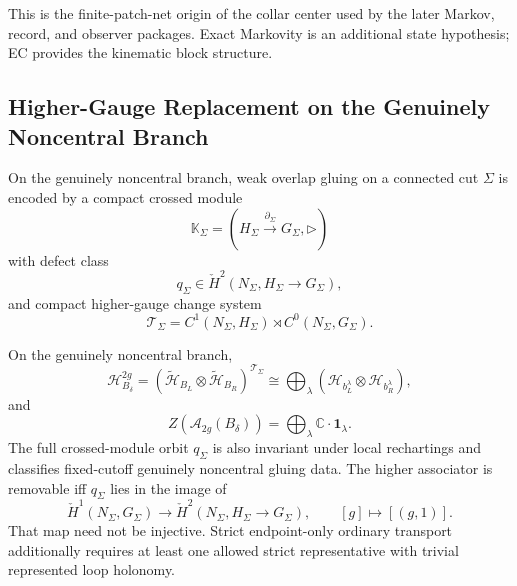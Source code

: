 \begin{remark}
This is the finite-patch-net origin of the collar center used by the later Markov, record, and
observer packages. Exact Markovity is an additional state hypothesis; EC provides the
kinematic block structure.
\end{remark}

\subsection{Higher-Gauge Replacement on the Genuinely Noncentral Branch}

\begin{proposition}
On the genuinely noncentral branch, weak overlap gluing on a connected cut \(\Sigma\) is encoded
by a compact crossed module
\[
\mathbb K_\Sigma=(H_\Sigma\xrightarrow{\partial_\Sigma}G_\Sigma,\triangleright)
\]
with defect class
\[
q_\Sigma\in \check H^2(N_\Sigma,H_\Sigma\to G_\Sigma),
\]
and compact higher-gauge change system
\[
\mathcal T_\Sigma=C^1(N_\Sigma,H_\Sigma)\rtimes C^0(N_\Sigma,G_\Sigma).
\]
\end{proposition}

\begin{theorem}
On the genuinely noncentral branch,
\[
\mathcal H_{B_\delta}^{2g}
=
(\tilde{\mathcal H}_{B_L}\otimes \tilde{\mathcal H}_{B_R})^{\mathcal T_\Sigma}
\cong
\bigoplus_\lambda
(\mathcal H_{b_L^\lambda}\otimes \mathcal H_{b_R^\lambda}),
\]
and
\[
Z(\mathcal A_{2g}(B_\delta))
=
\bigoplus_\lambda \mathbb C\cdot \mathbf 1_\lambda.
\]
The full crossed-module orbit \(q_\Sigma\) is also invariant under local rechartings and
classifies fixed-cutoff genuinely noncentral gluing data. The higher associator is removable iff
\(q_\Sigma\) lies in the image of
\[
\check H^1(N_\Sigma,G_\Sigma)\longrightarrow
\check H^2(N_\Sigma,H_\Sigma\to G_\Sigma),
\qquad [g]\longmapsto[(g,1)].
\]
That map need not be injective. Strict endpoint-only ordinary transport additionally requires at
least one allowed strict representative with trivial represented loop holonomy.
\end{theorem}

